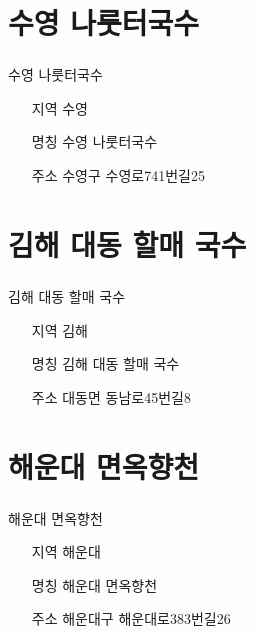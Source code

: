 \documentclass[aspectratio=1610,17pt,xcolor=pdftex,dvipsnames,table,handout]{beamer}
\begin{document}
		\section{ 수영 나룻터국수	}
		\begin{frame} [t,plain]
		\frametitle{ }
			\begin{block} {	수영 나룻터국수	}
			\setlength{\leftmargini}{4em}			
			\begin{itemize}
				\item [지역] 수영	
				\item [명칭] 수영 나룻터국수	
				\item [주소] 수영구 수영로741번길25
			\end{itemize}
			\end{block}						
		\end{frame}						


		\section{ 김해 대동 할매 국수	}
		\begin{frame} [t,plain]
		\frametitle{ }
			\begin{block} {	김해 대동 할매 국수	}
			\setlength{\leftmargini}{4em}			
			\begin{itemize}
				\item [지역] 김해	
				\item [명칭] 김해 대동 할매 국수	
				\item [주소] 대동면 동남로45번길8
			\end{itemize}
			\end{block}						
		\end{frame}						


		\section{ 해운대 면옥향천	}
		\begin{frame} [t,plain]
		\frametitle{ }
			\begin{block} {	해운대 면옥향천	}
			\setlength{\leftmargini}{4em}			
			\begin{itemize}
				\item [지역] 해운대	
				\item [명칭] 해운대 면옥향천	
				\item [주소] 해운대구 해운대로383번길26
			\end{itemize}
			\end{block}						
		\end{frame}						
\end{document}
